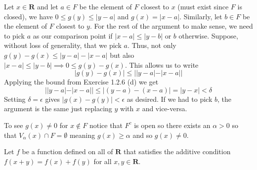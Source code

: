 \begin{solution}
  Let $x \in \mathbf R$ and let $a \in F$ be the element of $F$ closest to $x$ (must exist since $F$ is closed), we have $0 \le g(y) \le |y-a|$ and $g(x) = |x-a|$. Similarly, let $b \in F$ be the element of $F$ closest to $y$. For the rest of the argument to make sense, we need to pick $a$ as our comparison point if $|x-a| \le |y-b|$ or $b$ otherwise. Suppose, without loss of generality, that we pick $a$. Thus, not only $g(y)-g(x) \le |y-a|-|x-a|$ but also $|x-a| \le |y-b| \implies 0 \le g(y) - g(x)$. This allows us to write
  $$|g(y) - g(x)| \le ||y-a| - |x-a||$$
  Applying the bound from Exercise 1.2.6 (d) we get
  $$||y-a|-|x-a|| \le |(y-a) - (x-a)| = |y-x| < \delta$$
  Setting $\delta = \epsilon$ gives $|g(x)-g(y)|<\epsilon$ as desired. If we had to pick $b$, the argument is the same just replacing $y$ with $x$ and vice-versa.

  To see $g(x) \ne 0$ for $x \notin F$ notice that $F^c$ is open so there exists an $\alpha>0$ so that $V_\alpha(x) \cap F = \emptyset$ meaning $g(x) \ge \alpha$ and so $g(x) \ne 0$.
\end{solution}

\begin{exercise}
  Let $f$ be a function defined on all of $\mathbf{R}$ that satisfies the additive condition $f(x+y)=f(x)+f(y)$ for all $x, y \in \mathbf{R}$.
\end{exercise}

